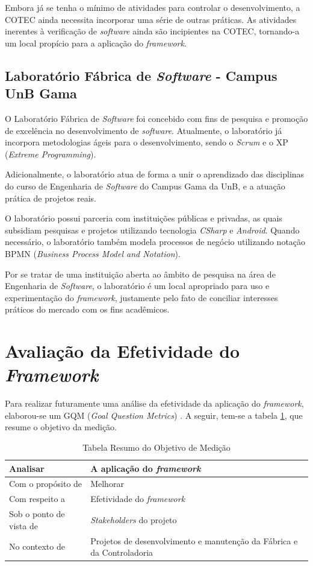 Embora já se tenha o mínimo de atividades para controlar o desenvolvimento, a COTEC ainda necessita incorporar uma série de outras práticas. As atividades inerentes à verificação de \textit{software} ainda são incipientes na COTEC, tornando-a um local propício para a aplicação do \textit{framework}.

\subsection{Laboratório Fábrica de \textit{Software} - Campus UnB Gama}

O Laboratório Fábrica de \textit{Software} foi concebido com fins de pesquisa e promoção de excelência no desenvolvimento de \textit{software}. Atualmente, o laboratório já incorpora metodologias ágeis para o desenvolvimento, sendo o \textit{Scrum} e o XP (\textit{Extreme Programming}).

Adicionalmente, o laboratório atua de forma a unir o aprendizado das disciplinas do curso de Engenharia de \textit{Software} do Campus Gama da UnB, e a atuação prática de projetos reais.

O laboratório possui parceria com instituições públicas e privadas, as quais subsidiam pesquisas e projetos utilizando tecnologia \textit{CSharp} e \textit{Android}. Quando necessário, o laboratório também modela processos de negócio utilizando notação BPMN (\textit{Business Process Model and Notation}).

Por se tratar de uma instituição aberta ao âmbito de pesquisa na área de Engenharia de \textit{Software}, o laboratório é um local apropriado para uso e experimentação do \textit{framework}, justamente pelo fato de conciliar interesses práticos do mercado com os fins acadêmicos.

\section{Avaliação da Efetividade do \textit{Framework}}

Para realizar futuramente uma análise da efetividade da aplicação do \textit{framework}, elaborou-se um GQM (\textit{Goal Question Metrics}) \cite{gqm}. A seguir, tem-se a tabela \ref{table:tabela1}, que resume o objetivo da medição.

\begin{table}[h]
\caption{Tabela Resumo do Objetivo de Medição}
\centering
\begin{tabular}{ | m{8cm} | m{8cm} | } 
\hline
Analisar & A aplicação do \textit{framework} \\ 
\hline
Com o propósito de & Melhorar \\ 
\hline
Com respeito a & Efetividade do \textit{framework} \\ 
\hline
Sob o ponto de vista de & \textit{Stakeholders} do projeto \\ 
\hline
No contexto de & Projetos de desenvolvimento e manutenção da Fábrica e da Controladoria \\ 
\hline
\end{tabular}
\label{table:tabela1}
\end{table}


